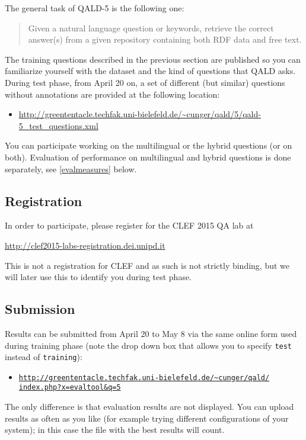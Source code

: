 
The general task of QALD-5 is the following one: 
\begin{quote}
Given a natural language question or keywords, retrieve the correct answer(s) from a given repository containing both RDF data and free text. 
\end{quote}

The training questions described in the previous section are published so you can familiarize yourself with the dataset and the kind of questions that QALD asks. 
During test phase, from April 20 on, a set of different (but similar) questions without annotations are provided at the following location:
\begin{itemize} 
\item[] \url{http://greententacle.techfak.uni-bielefeld.de/~cunger/qald/5/qald-5_test_questions.xml} 
\end{itemize} 

You can participate working on the multilingual or the hybrid questions (or on both). 
Evaluation of performance on multilingual and hybrid questions is done separately, see \ref{evalmeasures} below.


\subsection{Registration} 

In order to participate, please register for the CLEF 2015 QA lab at 
\begin{center}
\url{http://clef2015-labs-registration.dei.unipd.it}
\end{center} 
This is not a registration for CLEF and as such is not strictly binding, 
but we will later use this to identify you during test phase.


\subsection{Submission}

Results can be submitted from April 20 to May 8 via the same online form used during training phase 
(note the drop down box that allows you to specify {\tt test} instead of {\tt training}):

\begin{itemize}
\item[] \href{http://greententacle.techfak.uni-bielefeld.de/~cunger/qald/index.php?x=evaltool&q=5}{\texttt{http://greententacle.techfak.uni-bielefeld.de/\textasciitilde cunger/qald/\\index.php?x=evaltool\&q=5}}
\end{itemize}
The only difference is that evaluation results are not displayed. 
You can upload results as often as you like (for example trying different configurations of your system); 
in this case the file with the best results will count.

